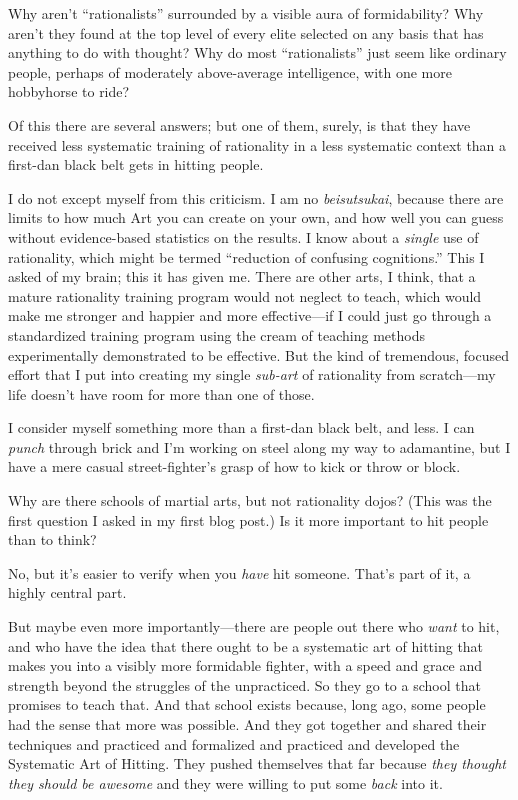 {
 Why aren't
``rationalists'' surrounded by a
visible aura of formidability? Why aren't they found at
the top level of every elite selected on any basis that has anything to
do with thought? Why do most
``rationalists'' just seem like
ordinary people, perhaps of moderately above-average intelligence, with
one more hobbyhorse to ride?}

{
 Of this there are several answers; but one of them, surely, is
that they have received less systematic training of rationality in a
less systematic context than a first-dan black belt gets in hitting
people.}

{
 I do not except myself from this criticism. I am no
\textit{beisutsukai}, because there are limits to how much Art you can
create on your own, and how well you can guess without evidence-based
statistics on the results. I know about a \textit{single} use of
rationality, which might be termed ``reduction of
confusing cognitions.'' This I asked of my brain;
this it has given me. There are other arts, I think, that a mature
rationality training program would not neglect to teach, which would
make me stronger and happier and more effective---if I could just go
through a standardized training program using the cream of teaching
methods experimentally demonstrated to be effective. But the kind of
tremendous, focused effort that I put into creating my single
\textit{sub-art} of rationality from scratch---my life
doesn't have room for more than one of those.}

{
 I consider myself something more than a first-dan black belt, and
less. I can \textit{punch} through brick and I'm
working on steel along my way to adamantine, but I have a mere casual
street-fighter's grasp of how to kick or throw or
block.}

{
 Why are there schools of martial arts, but not rationality dojos?
(This was the first question I asked in my first blog post.) Is it more
important to hit people than to think?}

{
 No, but it's easier to verify when you
\textit{have} hit someone. That's part of it, a highly
central part.}

{
 But maybe even more importantly---there are people out there who
\textit{want} to hit, and who have the idea that there ought to be a
systematic art of hitting that makes you into a visibly more formidable
fighter, with a speed and grace and strength beyond the struggles of
the unpracticed. So they go to a school that promises to teach that.
And that school exists because, long ago, some people had the sense
that more was possible. And they got together and shared their
techniques and practiced and formalized and practiced and developed the
Systematic Art of Hitting. They pushed themselves that far because
\textit{they thought they should be awesome} and they were willing to
put some \textit{back} into it.}

